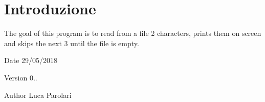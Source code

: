 \hypertarget{index_intro}{}\section{Introduzione}\label{index_intro}
The goal of this program is to read from a file 2 characters, prints them on screen and skips the next 3 until the file is empty.~\newline
 \begin{DoxyDate}{Date}
29/05/2018 
\end{DoxyDate}
\begin{DoxyVersion}{Version}
0.. 
\end{DoxyVersion}
\begin{DoxyAuthor}{Author}
Luca Parolari 
\end{DoxyAuthor}
